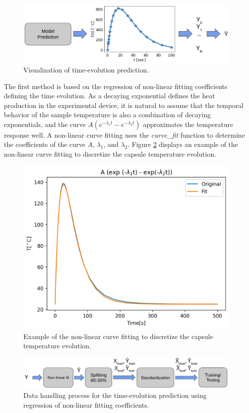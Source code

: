 \begin{figure}[htbp!] %
  \centering
  \includegraphics[width=0.7\linewidth]{figures/data-prediction-t}
  \caption{Visualization of time-evolution prediction.}
  \label{fig:data-class1}
\end{figure}

The first method is based on the regression of non-linear fitting coefficients defining the time evolution.
As a decaying exponential defines the heat production in the experimental device, it is natural to assume that the temporal behavior of the sample temperature is also a combination of decaying exponentials, and the curve $A (e^{-\lambda_1 t} - e^{-\lambda_2 t})$ approximates the temperature response well.
A non-linear curve fitting uses the \textit{curve\_fit} function \cite{2020SciPy-NMeth} to determine the coefficients of the curve $A$, $\lambda_1$, and $\lambda_2$.
Figure \ref{fig:nlin-fit} displays an example of the non-linear curve fitting to discretize the capsule temperature evolution.

\begin{figure}[htbp!] %
  \centering
  \includegraphics[width=0.7\linewidth]{figures/non-linear-fit}
  \caption{Example of the non-linear curve fitting to discretize the capsule temperature evolution.}
  \label{fig:nlin-fit}
\end{figure}

\begin{figure}[htbp!] %
  \centering
  \includegraphics[width=0.7\linewidth]{figures/data-pross-regression}
  \caption{Data handling process for the time-evolution prediction using regression of non-linear fitting coefficients.}
  \label{fig:data-reg}
\end{figure}

